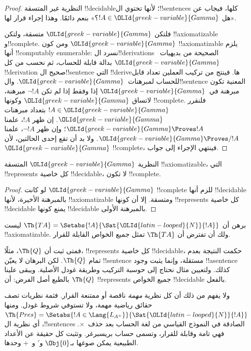 \documentclass[../../../include/open-logic-section]{subfiles}
\begin{document}
\begin{proof}
النظرية غير المتسقة !!{decidable}؛ لأنها
تحتوي ال!!{sentence}s كلها، فيجاب عن
«هل $!A\in\OLId{greek-variable}{Gamma}$؟» بنعم دائمًا. وهذا
إجراء قرار لها.

فلتكن $\OLId{greek-variable}{Gamma}$ متسقة، ولتكن !!{axiomatizable}
و!!{complete}. ومن كون $\OLId{greek-variable}{Gamma}$
!!{axiomatizable} يلزم أنها !!{computably enumerable}:
نسرد ال!!{derivation}s الصحيحة من بديهيات~$\OLId{greek-variable}{Gamma}$
بدالة قابلة للحساب، ثم نحسب من كل
!!{derivation} صحيح ال!!{sentence} التي
!!{derive}ها. فينتج من تركيب العملين
تعداد قابل للحساب لمبرهنات~$\OLId{greek-variable}{Gamma}$.
وال!!{sentence} المعنية تكون مبرهنة
في~$\OLId{greek-variable}{Gamma}$ إذا وفقط إذا لم تكن $\lnot !A$
مبرهنة، لاتساق $\OLId{greek-variable}{Gamma}$ وكونها !!{complete}.
فلنقرر $!A\in\OLId{greek-variable}{Gamma}$ بتعداد مبرهنات $\OLId{greek-variable}{Gamma}$.
إن ظهر $!A$، علمنا $\OLId{greek-variable}{Gamma}\Proves !A$؛
وإن ظهر $\lnot !A$، علمنا
$\OLId{greek-variable}{Gamma}\Proves/ !A$. ولا بد أن تقع
إحدى الحالتين، لأن $\OLId{greek-variable}{Gamma}$ !!{complete}،
فينتهي الإجراء إلى جواب.
\end{proof}

\begin{cor}
النظرية $\OLId{greek-variable}{Gamma}$ المتسقة !!{axiomatizable}، التي
!!{represents} كل خاصية !!{decidable}، لا تكون !!{complete}.
\end{cor}

\begin{proof}
لو كانت $\OLId{greek-variable}{Gamma}$ !!{complete} للزم أنها
!!{decidable} بالمبرهنة الأخيرة، لأنها
!!{axiomatizable} ومتسقة. إلا أن كونها
!!{represents} كل خاصية !!{decidable}
يمنع كونها !!{decidable} بالمبرهنة الأولى.
\end{proof}

\begin{prob}
برهن أن $\Th{TA}=\Setabs{!A}{\Sat{\OLId{latin-looped}{N}}{!A}}$ ليست
!!{axiomatizable}. ولك أن تفترض أن $\Th{TA}$ تمثل جميع الخواص
القابلة للقرار.
\end{prob}

فمتى ثبت أن $\Th{Q}$، مثلًا، !!{represents}
كل خاصية !!{decidable}، حكمت النتيجة
بعدم تمام $\Th{Q}$. لكن البرهان لا
يعيّن !!{sentence} مستقلة، وإنما يثبت
وجود !!a{sentence} كذلك. ولتعيين مثال
نحتاج إلى حوسبة التركيب وطريقة غودل الأصلية.
ويبقى علينا بالطبع أصل الفرض: أن
$\Th{Q}$ !!{represents} جميع الخواص
!!{decidable} بالفعل.

ولا يفهم من ذلك أن كل نظرية \emph{مهمة}
ناقصة أو ممتنعة القرار. فثمة نظريات
تصف حقائق رياضية مهمة، ولا تستوفي
شروط غودل. ومنها
$\Th{Pres}=\Setabs{!A\in\Lang{L_{A^+}}}{\Sat{\OLId{latin-looped}{N}}{!A}}$،
أي نظرية ال!!{sentence}s الصادقة في
النموذج القياسي من لغة الحساب بعد حذف~$\times$.
فهي تامة وقابلة للقرار، وتسمى حساب بريسبرغر.
وتثبت كل حقيقة عن الأعداد الطبيعية يمكن
صوغها بـ$\Obj{0}$ و$\prime$ و~$+$ وحدها.
\end{document}
